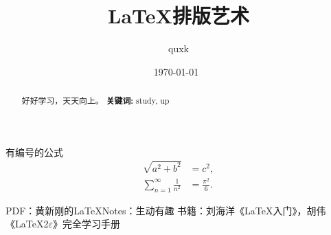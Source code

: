 \documentclass{ctexart}%
\title{\LaTeX 排版艺术}%
\author{quxk}
\date{\small \today \ \\ {\it}}
\begin{document}
\maketitle %

\begin{abstract}%
	好好学习，天天向上。	
	\textbf{关键词:} study, up
\end{abstract}

\newpage %
\tableofcontents%












\newpage
有编号的公式
\begin{align}\label{eq:1}
\sqrt{a^2 + b^2} &= c^2,\\
\sum_{n=1}^\infty \frac1{n^2}&=\frac{\pi^2}6.\label{eq:2}
\end{align}










\begin{thebibliography}{99}
 PDF：黄新刚的\LaTeX Notes：生动有趣
 书籍：刘海洋《\LaTeX 入门》，胡伟《\LaTeX2$\varepsilon$》完全学习手册
\end{thebibliography}
\end{document}
